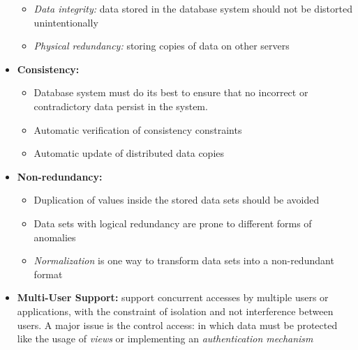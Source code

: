 \begin{itemize}
    \begin{itemize}
        \item \textit{Data integrity:} data stored in the database system should not be distorted unintentionally
        \item \textit{Physical redundancy:} storing copies of data on other servers
    \end{itemize}
    \item \textbf{Consistency:} 
    \begin{itemize}
        \item Database system must do its best to ensure that no incorrect or contradictory data persist in the system.
        \item Automatic verification of consistency constraints
        \item Automatic update of distributed data copies
    \end{itemize}
    \item \textbf{Non-redundancy:} 
    \begin{itemize}
        \item Duplication of values inside the stored data sets should be avoided
        \item Data sets with logical redundancy are prone to different forms of anomalies
        \item \textit{Normalization} is one way to transform data sets into a non-redundant format
    \end{itemize}
    \item \textbf{Multi-User Support:} support concurrent accesses by multiple users or applications, with the constraint of isolation and not interference between users. A major issue is the control access: in which data must be protected like the usage of \textit{views} or implementing an \textit{authentication mechanism}
\end{itemize}

